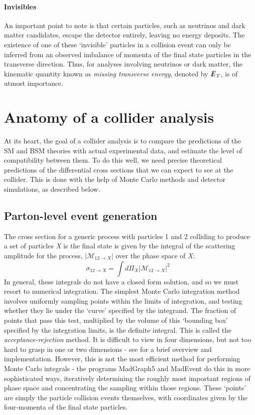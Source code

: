 \paragraph{Invisibles} An important point to note is that certain particles, such as neutrinos and dark matter candidates, escape the detector entirely, leaving no energy deposits. The existence of one of these `invisible' particles in a collision event can only be inferred from an observed imbalance of momenta of the final state particles in the transverse direction. Thus, for analyses involving neutrinos or dark matter, the kinematic quantity known as \emph{missing transverse energy}, denoted by $\slashed{E}_T$, is of utmost importance.

\section{Anatomy of a collider analysis}
At its heart, the goal of a collider analysis is to compare the predictions of the SM and BSM theories with actual experimental data, and estimate the level of compatibility between them. To do this well, we need precise theoretical predictions of the differential cross sections that we can expect to see at the collider. This is done with the help of Monte Carlo methods and detector simulations, as described below. 
\subsection{Parton-level event generation}
The cross section for a generic process with particles 1 and 2 colliding to produce a set of particles \emph{X} is the final state is given by the integral of the scattering amplitude for the process, $|\mathcal{M}_{12\rightarrow X}|$ over the phase space of \emph{X}:
\[\sigma_{12\rightarrow X} = \int d\Pi_X|\mathcal{M}_{12\rightarrow X}|^2\]
In general, these integrals do not have a closed form solution, and so we must resort to numerical integration. The simplest Monte Carlo integration method involves uniformly sampling points within the limits of integration, and testing whether they lie under the `curve' specified by the integrand. The fraction of points that pass this test, multiplied by the volume of this `bounding box' specified by the integration limits, is the definite integral. This is called the \emph{acceptance-rejection} method. It is difficult to view in four dimensions, but not too hard to grasp in one or two dimensions - see \citep{Pyarelal2011} for a brief overview and implementation. However, this is not the most efficient method for performing Monte Carlo integrals - the programs MadGraph5 and MadEvent \citep{Alwall2014} do this in more sophisticated ways, iteratively determining the roughly most important regions of phase space and concentrating the sampling within those regions. These `points' are simply the particle collision events themselves, with coordinates given by the four-momenta of the final state particles. 
